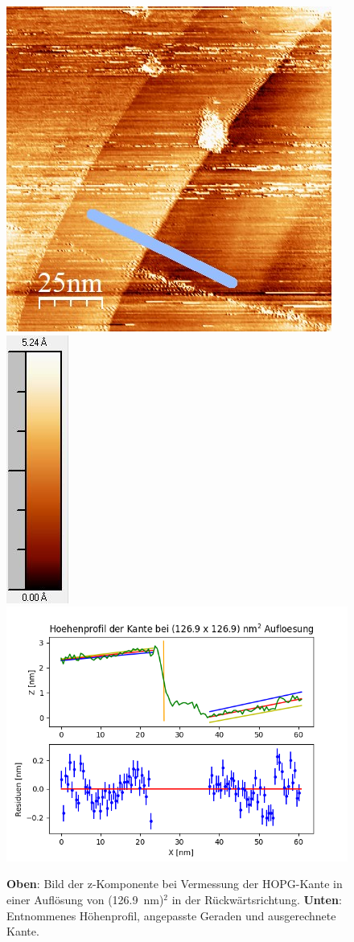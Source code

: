 \documentclass[12pt,a4paper]{article}
\begin{document}
\begin{figure}[H]
\centering
\includegraphics[scale=0.59]{Bilder/Anhang/Kante/1269_Kante_nach.jpg}
\includegraphics[scale=0.7]{Bilder/Anhang/Kante/1269_Kante_nach_Skala.jpg}
\includegraphics[scale=0.55]{Bilder/Anhang/Kante/Profil_Kante_1269_rueck.png}
\caption{\textbf{Oben}: Bild der z-Komponente bei Vermessung der HOPG-Kante in einer Auflösung von (\SI{126,9}{nm})$^2$ in der Rückwärtsrichtung. \textbf{Unten}: Entnommenes Höhenprofil, angepasste Geraden und ausgerechnete Kante.}
\end{figure}
\end{document}

